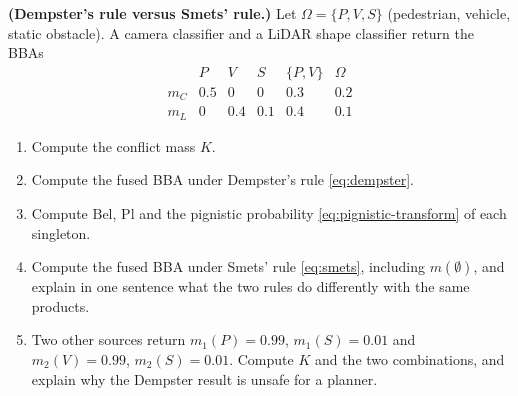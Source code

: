 \begin{prob}\label{prob:ch03:7}
\textbf{(Dempster's rule versus Smets' rule.)} Let $\Omega=\{P,V,S\}$ (pedestrian, vehicle, static obstacle). A camera classifier and a LiDAR shape classifier return the BBAs
\begin{equation*}
\begin{array}{c|ccccc}
 & P & V & S & \{P,V\} & \Omega\\
\hline
m_C & 0.5 & 0 & 0 & 0.3 & 0.2\\
m_L & 0 & 0.4 & 0.1 & 0.4 & 0.1
\end{array}
\end{equation*}
\begin{enumerate}
\item[(a)] Compute the conflict mass $K$.
\item[(b)] Compute the fused BBA under Dempster's rule \eqref{eq:dempster}.
\item[(c)] Compute $\mathrm{Bel}$, $\mathrm{Pl}$ and the pignistic probability \eqref{eq:pignistic-transform} of each singleton.
\item[(d)] Compute the fused BBA under Smets' rule \eqref{eq:smets}, including $m(\emptyset)$, and explain in one sentence what the two rules do differently with the same products.
\item[(e)] Two other sources return $m_1(P)=0.99$, $m_1(S)=0.01$ and $m_2(V)=0.99$, $m_2(S)=0.01$. Compute $K$ and the two combinations, and explain why the Dempster result is unsafe for a planner.
\end{enumerate}
\end{prob}

